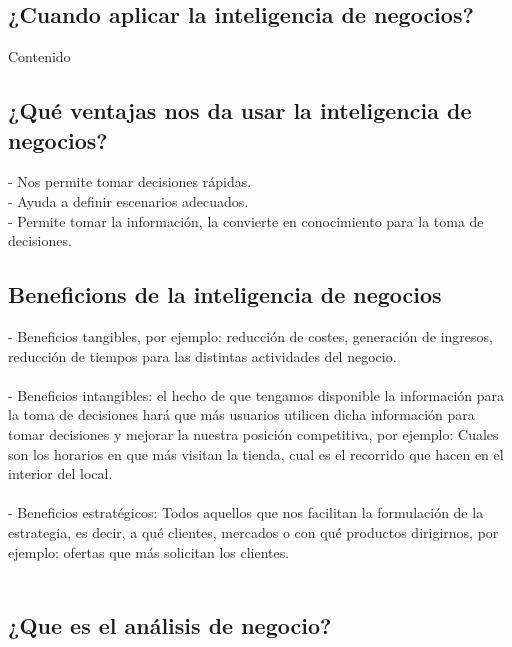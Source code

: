 \documentclass[twoside,twocolumn]{article}
\begin{document}
\subsection{¿Cuando aplicar la inteligencia de negocios?}

Contenido

\subsection{¿Qué ventajas nos da usar la inteligencia de negocios?}

- Nos permite tomar decisiones rápidas. \\
- Ayuda a definir escenarios adecuados. \\
- Permite tomar la información, la convierte en conocimiento para la toma de decisiones. \\
\subsection{Beneficions de la inteligencia de negocios}

- Beneficios tangibles, por ejemplo: reducción de costes, generación de ingresos, reducción de tiempos para las distintas actividades del negocio. \\\\
- Beneficios intangibles: el hecho de que tengamos disponible la información para la toma de decisiones hará que más usuarios utilicen dicha información para tomar decisiones y mejorar la nuestra posición competitiva, por ejemplo: Cuales son los horarios en que más visitan la tienda, cual es el recorrido que hacen en el interior del local. \\\\
- Beneficios estratégicos: Todos aquellos que nos facilitan la formulación de la estrategia, es decir, a qué clientes, mercados o con qué productos dirigirnos, por ejemplo: ofertas que más solicitan los clientes. \\\\

\subsection{¿Que es el análisis de negocio?}
\end{document}
